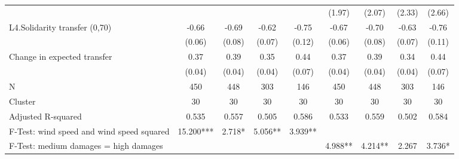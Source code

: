 {\begin{tabular}{l*{8}{c}}
                    &                     &                     &                     &                     &      (1.97)         &      (2.07)         &      (2.33)         &      (2.66)         \\
L4.Solidarity transfer (0,70)&       -0.66\sym{***}&       -0.69\sym{***}&       -0.62\sym{***}&       -0.75\sym{***}&       -0.67\sym{***}&       -0.70\sym{***}&       -0.63\sym{***}&       -0.76\sym{***}\\
                    &      (0.06)         &      (0.08)         &      (0.07)         &      (0.12)         &      (0.06)         &      (0.08)         &      (0.07)         &      (0.11)         \\
Change in expected transfer&        0.37\sym{***}&        0.39\sym{***}&        0.35\sym{***}&        0.44\sym{***}&        0.37\sym{***}&        0.39\sym{***}&        0.34\sym{***}&        0.44\sym{***}\\
                    &      (0.04)         &      (0.04)         &      (0.04)         &      (0.07)         &      (0.04)         &      (0.04)         &      (0.04)         &      (0.07)         \\
\midrule
N                   &         450         &         448         &         303         &         146         &         450         &         448         &         303         &         146         \\
Cluster             &          30         &          30         &          30         &          30         &          30         &          30         &          30         &          30         \\
Adjusted R-squared  &       0.535         &       0.557         &       0.505         &       0.586         &       0.533         &       0.559         &       0.502         &       0.584         \\
F-Test: wind speed and wind speed squared&   15.200***         &      2.718*         &     5.056**         &     3.939**         &                     &                     &                     &                     \\
F-Test: medium damages = high damages&                     &                     &                     &                     &     4.988**         &     4.214**         &       2.267         &      3.736*         \\
\bottomrule
\end{tabular}
}

